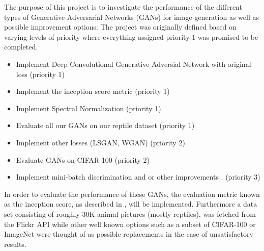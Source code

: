The purpose of this project is to investigate the performance of the different types of Generative Adversarial Networks (GANs) \cite{goodfellow2014generative} for image generation as well as possible improvement options.
The project was originally defined based on varying levels of priority where everything assigned priority 1 was promised to be completed.

\begin{itemize}
	\item Implement Deep Convolutional Generative Adversial Network with original loss \cite{DBLP:journals/corr/RadfordMC15} (priority 1)
	\item Implement the inception score metric \cite{salimans2016improved} (priority 1)
	\item Implement Spectral Normalization (priority 1)
	\item Evaluate all our GANs on our reptile dataset (priority 1)
	\item Implement other losses (LSGAN, WGAN) \cite{mao2017least} (priority 2)
	\item Evaluate GANs on CIFAR-100 (priority 2)
	\item Implement mini-batch discrimination and or other improvements \cite{salimans2016improved}. (priority 3)
\end{itemize}

In order to evaluate the performance of these GANs, the evaluation metric known as the inception score, as described in \cite{salimans2016improved}, will be implemented. Furthermore a data set consisting of roughly 30K animal pictures (mostly reptiles), was fetched from the Flickr API while other well known options such as a subset of CIFAR-100 or ImageNet were thought of as possible replacements in the case of unsatisfactory results.

